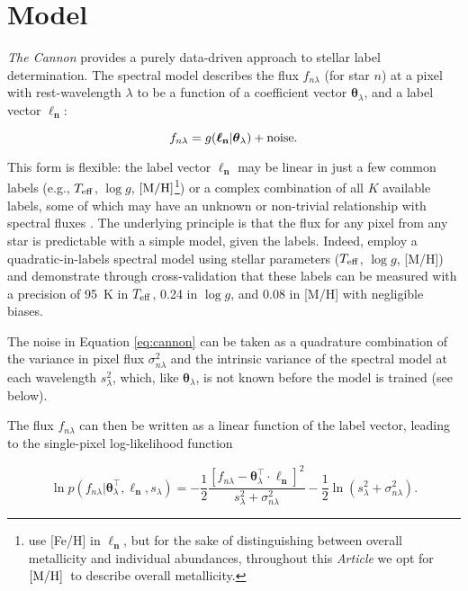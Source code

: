 \documentclass[useAMS,usenatbib]{mn2e}
\newcommand\article{\textit{Article}}
\newcommand\tc{\textit{The Cannon}}
\newcommand\lv{\mathbf{\boldsymbol\ell_n}}
\newcommand\cv{{\boldsymbol\theta}_\lambda}
\newcommand\given{|}
\newcommand\teff{$T_{\rm eff}$}
\newcommand\logg{$\log{g}$}
\newcommand\mh{${\rm [M/H]}$}
\begin{document}
\section{Model}
\label{sec:model}

\tc{} provides a purely data-driven approach to stellar label determination. The
spectral model describes the flux $f_{n\lambda}$ (for star $n$) at a pixel with rest-wavelength $\lambda$ to be a function
of a coefficient vector $\cv$, and a label vector $\lv$:

\begin{equation}
    f_{n\lambda} = g(\lv\given\cv) + {\rm noise}.
    \label{eq:cannon}
\end{equation}

This form is flexible: the label vector $\lv$ may be linear in just a few common
labels (e.g., \teff, \logg, \mh\footnote{\citet{Ness15a} use [Fe/H] in $\lv$, 
but for the sake of distinguishing between overall metallicity and individual 
abundances, throughout this \article{} we opt for \mh\ to describe overall 
metallicity.}) or a complex combination of all $K$ available labels, some of which
may have an unknown or non-trivial relationship with spectral fluxes \citep[e.g.,
ages and masses, see][]{Nissen15, Ness15b}. The underlying principle is that the 
flux for any pixel from any star is predictable with a simple model, given the
labels. Indeed, \citet{Ness15a} employ a quadratic-in-labels spectral model 
using stellar parameters ($T_{\rm eff}$, $\log{g}$, [M/H]) and demonstrate 
through cross-validation that these labels can be measured with a precision of 
95~K in $T_{\rm eff}$, 0.24 in $\log{g}$, and 0.08 in [M/H] with negligible biases. 

The noise in Equation \ref{eq:cannon} can be taken as a quadrature combination
of the variance in pixel flux $\sigma_{n\lambda}^2$ and the intrinsic variance 
of the spectral model at each wavelength $s_\lambda^2$, which, like $\cv$, is
not known before the model is trained (see below).

The flux $f_{n\lambda}$ can then be written as a linear function of the label 
vector, leading to the single-pixel log-likelihood function

\begin{equation}
\ln{p}\left(f_{n\lambda}\given\cv^\intercal,\lv, s_{\lambda}\right) = -\frac{1}{2}\frac{\left[f_{n\lambda} - \cv^{\intercal}\cdot\lv\right]^2}{s_\lambda^2 + \sigma_{n\lambda}^2} -\frac{1}{2}\ln\left(s_{\lambda}^2 + \sigma_{n\lambda}^2\right).
\label{eq:pixel-log-likelihood}
\end{equation}
\end{document}
